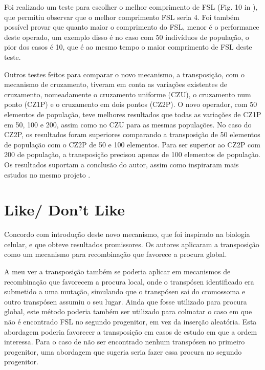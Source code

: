 \documentclass[11pt,portuguese,a4paper]{article}
\begin{document}
Foi realizado um teste para escolher o melhor comprimento de FSL (Fig. 10 in \cite{Simoes99transposition:a}), que permitiu observar que o melhor comprimento FSL seria 4. Foi também possível provar que quanto maior o comprimento do FSL, menor é o performance deste operado, um exemplo disso é no caso com 50 indivíduos de população, o pior dos casos é 10, que é ao mesmo tempo o maior comprimento de FSL deste teste.

Outros testes feitos para comparar o novo mecanismo, a transposição, com o mecanismo de cruzamento, tiveram em conta as variações existentes de cruzamento, nomeadamente o cruzamento uniforme (CZU), o cruzamento num ponto (CZ1P) e o cruzamento em dois pontos (CZ2P).
O novo operador, com 50 elementos de população, teve melhores resultados que todas as variações de CZ1P em 50, 100 e 200, assim como no CZU para as mesmas populações.
No caso do CZ2P, os resultados foram superiores comparando a transposição de 50 elementos de população com o CZ2P de 50 e 100 elementos. Para ser superior ao  CZ2P com 200 de população, a transposição precisou apenas de 100 elementos de população.
Os resultados suportam a conclusão do autor, assim como inspiraram mais estudos no mesmo projeto \cite{Simoes00usinggenetic}.


\section{Like/ Don't Like}

Concordo com introdução deste novo mecanismo, que foi inspirado na biologia celular, e que obteve resultados promissores. Os autores aplicaram a transposição como um mecanismo para recombinação que favorece a procura global.

A meu ver a transposição também se poderia aplicar em mecanismos de recombinação que favorecem a procura local, onde o transpósen identificado era submetido a uma mutação, simulando que o transpósen sai do cromossoma e outro transpósen assumiu o seu lugar. Ainda que fosse utilizado para procura global, este método poderia também ser utilizado para colmatar o caso em que não é encontrado FSL no segundo progenitor, em vez da inserção aleatória. Esta abordagem poderia favorecer a transposição em casos de estudo em que a ordem interessa.
Para o caso de não ser encontrado nenhum transpósen no primeiro progenitor, uma abordagem que sugeria seria fazer essa procura no segundo progenitor.



\renewcommand{\bibfont}{\small}

\end{document}
